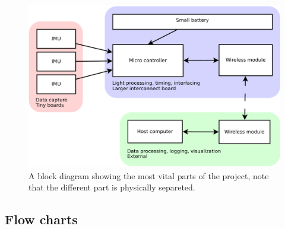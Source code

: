 \documentclass[a4paper, 12pt]{article}
\begin{document}
\begin{figure}[h!]
    \centering
    \includegraphics[scale=0.38]{block.pdf}
    \caption{A block diagram showing the most vital parts of the project, note that the different part is physically separeted.}
    \label{fig:pic2}
\end{figure}

\subsection*{Flow charts}
\end{document}
